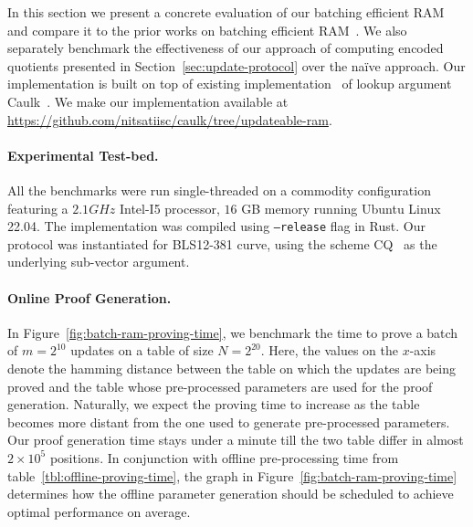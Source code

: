 In this section we present a concrete evaluation of our batching efficient RAM and compare it to the
prior works on batching efficient RAM~\cite{USENIX:OWWB20,CCS:CFHKKO22}.
We also separately benchmark the effectiveness of our approach of computing encoded quotients presented
in Section~\ref{sec:update-protocol} over the na\"{i}ve approach.
Our implementation is built on top of existing implementation~\cite{caulk-implementation}
of lookup argument Caulk~\cite{CCS:ZBKMNS22}. We make our implementation available at
\url{https://github.com/nitsatiisc/caulk/tree/updateable-ram}. 

\paragraph{\bf Experimental Test-bed.} All the benchmarks were run single-threaded on a commodity configuration featuring a
$2.1GHz$ Intel-I5 processor, $16$ GB memory running Ubuntu Linux 22.04. The implementation was compiled using {\tt --release}
flag in Rust. Our protocol was instantiated for BLS12-381 curve, using the scheme CQ~\cite{EPRINT:EagFioGab22}
as the underlying sub-vector argument.

\paragraph{\bf Online Proof Generation.} In Figure~\ref{fig:batch-ram-proving-time}, we benchmark the time
to prove a batch of $m=2^{10}$ updates on a table of size $N=2^{20}$. Here, the values on the $x$-axis denote
the hamming distance between the table on which the updates are being proved and the table whose pre-processed
parameters are used for the proof generation. Naturally, we expect the proving time to increase as the table
becomes more distant from the one used to generate pre-processed parameters. Our proof generation time stays
under a minute till the two table differ in almost $2\times 10^5$ positions. In conjunction with offline
pre-processing time from table~\ref{tbl:offline-proving-time}, the graph in Figure~\ref{fig:batch-ram-proving-time}
determines how the offline parameter generation should be scheduled to achieve optimal performance on average.

